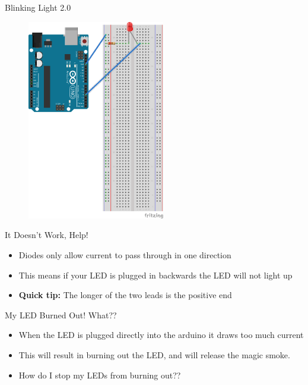 \documentclass[serif,mathserif, 12pt]{beamer}
\begin{document}
\begin{frame}{Blinking Light 2.0}

    \begin{figure}
    \centering
    \includegraphics[width=6cm]{images/BlinkingLight.png}
    \end{figure}

\end{frame}

\begin{frame}{It Doesn't Work, Help!}
    \begin{itemize}
        \item Diodes only allow current to pass through in one direction\pause
        \item This means if your LED is plugged in backwards the LED will not light up \pause
        \item \textbf{Quick tip:} The longer of the two leads is the positive end \pause
    \end{itemize}
\end{frame}

\begin{frame}{My LED Burned Out! What??}
    \begin{itemize}
        \item When the LED is plugged directly into the arduino it draws too much current \pause
        \item This will result in burning out the LED, and will release the magic smoke. \pause
        \item How do I stop my LEDs from burning out?? \pause
    \end{itemize}
\end{frame}
\end{document}
